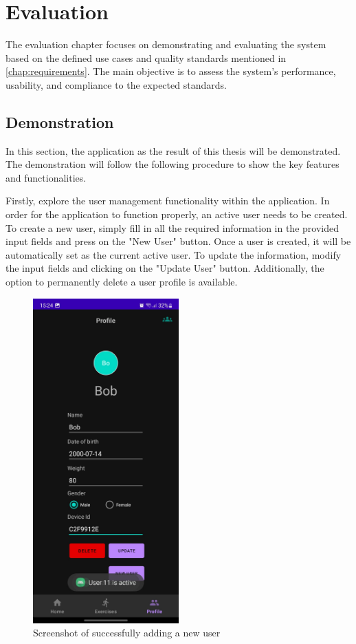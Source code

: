 \chapter{Evaluation}

The evaluation chapter focuses on demonstrating and evaluating the system based on the defined use cases and quality standards mentioned in \autoref{chap:requirements}. 
The main objective is to assess the system's performance, usability, and compliance to the expected standards. 

\section{Demonstration}
In this section, the application as the result of this thesis will be demonstrated. The demonstration will follow the following procedure to show the key features and functionalities.

Firstly, explore the user management functionality within the application. 
In order for the application to function properly, an active user needs to be created.
To create a new user, simply fill in all the required information in the provided input fields and press on the "New User" button.
Once a user is created, it will be automatically set as the current active user.
To update the information, modify the input fields and clicking on the "Update User" button.
Additionally, the option to permanently delete a user profile is available.
\begin{figure}[H]
    \centering
    \includegraphics[width=0.5\textwidth]{images/add-new-user.jpeg}
    \caption{Screenshot of successfully adding a new user}
    \label{fig:add-new-user-screenshot}
\end{figure}

